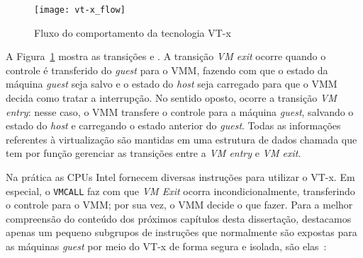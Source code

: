 \begin{figure}[!h]
  \centering
  \texttt{[image: vt-x\_flow]} 
  \caption{Fluxo do comportamento da tecnologia VT-x}
  \label{fig:vt-x_flow}
\end{figure}

A Figura~\ref{fig:vt-x_flow} mostra as transições  e
. A transição \emph{VM exit} ocorre quando o controle é
transferido do \emph{guest} para o VMM, fazendo com que o estado da máquina
\emph{guest} seja salvo e o estado do \emph{host} seja carregado para que o VMM
decida como tratar a interrupção. No sentido oposto, ocorre a transição
\emph{VM entry}: nesse caso, o VMM transfere o controle para a máquina
\emph{guest}, salvando o estado do \emph{host} e carregando o estado
anterior do \emph{guest}. Todas as informações referentes à virtualização são
mantidas em uma estrutura de dados chamada  que tem por função gerenciar as transições entre a
\emph{VM entry} e \emph{VM exit}.

Na prática as CPUs Intel fornecem diversas instruções para utilizar o VT-x. Em
especial, o \texttt{VMCALL} faz com que \emph{VM Exit} ocorra
incondicionalmente, transferindo o controle para o VMM; por sua vez, o VMM
decide o que fazer. Para a melhor compreensão do conteúdo dos próximos
capítulos desta dissertação, destacamos apenas um pequeno subgrupos de
instruções que normalmente são expostas para as máquinas \emph{guest} por meio
do VT-x de forma segura e isolada, são elas~\citep{intelmanual}:

